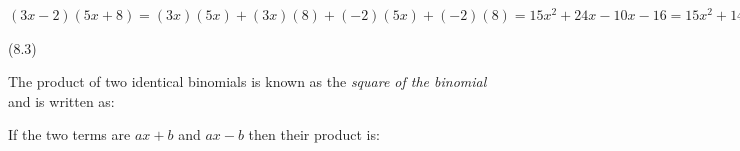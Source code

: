 {\begin{mdframed}[linewidth=4, leftmargin=40, rightmargin=40]
\begin{exercise}
\begin{enumerate}[noitemsep, label=\textbf{Step} \textbf{\arabic*}. ]
{    \setlength{\mymathboxwidth}{\columnwidth}
      \addtolength{\mymathboxwidth}{-48pt}
    \par\vspace{12pt}\noindent\begin{minipage}{\columnwidth}
    \parbox[t]{\mymathboxwidth}{\large$
    \left(3x-2\right)\left(5x+8\right)=\left(3x\right)\left(5x\right)+\left(3x\right)\left(8\right)+\left(-2\right)\left(5x\right)+\left(-2\right)\left(8\right)=15{x}^{2}+24x-10x-16=15{x}^{2}+14x-16$}\hfill
    \parbox[t]{48pt}{\raggedleft 
    (8.3)}
    \end{minipage}\vspace{12pt}\par
    }%
        \end{enumerate}
    \end{exercise}
    \end{mdframed}
    }
    \noindent
        \label{m39383*id268534}The product of two identical binomials is known as the \textsl{square of the binomial} and is written as:\par 
        \label{m39383*id268543}\nopagebreak\noindent{}
        \label{m39383*id268608}If the two terms are $ax+b$\hspace{1ex} and $ax-b$\hspace{1ex} then their product is:\par 
